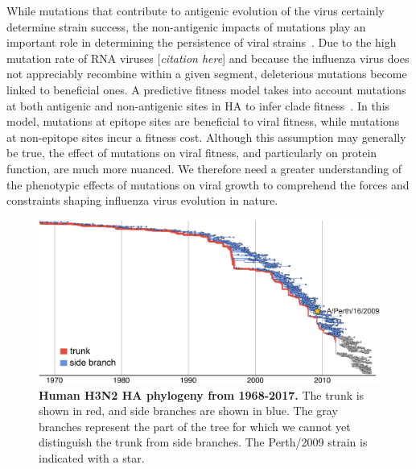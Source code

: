 \documentclass[9pt,twocolumn,twoside]{pnas-new}
\newcommand{\comment}[1]{{\color{red}[\textsl{#1}]}}
\begin{document}
While mutations that contribute to antigenic evolution of the virus certainly determine strain success, the non-antigenic impacts of mutations play an important role in determining the persistence of viral strains~\cite{pybus2007phylogenetic,kucharski2011influenza,strelkowa2012clonal,luksza2014predictive,koelle2015effects}.
Due to the high mutation rate of RNA viruses \comment{citation here} and because the influenza virus does not appreciably recombine within a given segment, deleterious mutations become linked to beneficial ones.
A predictive fitness model takes into account mutations at both antigenic and non-antigenic sites in HA to infer clade fitness~\cite{luksza2014predictive}.
In this model, mutations at epitope sites are beneficial to viral fitness, while mutations at non-epitope sites incur a fitness cost.
Although this assumption may generally be true, the effect of mutations on viral fitness, and particularly on protein function, are much more nuanced.
We therefore need a greater understanding of the phenotypic effects of mutations on viral growth to comprehend the forces and constraints shaping influenza virus evolution in nature.

\begin{figure}
\centering
\includegraphics[width=\linewidth]{figs/H3N2_phylogeny/H3N2_phylogeny.pdf}
\caption{\label{fig:H3N2_phylogeny}
{\bf Human H3N2 HA phylogeny from 1968-2017.}
The trunk is shown in red, and side branches are shown in blue.
The gray branches represent the part of the tree for which we cannot yet distinguish the trunk from side branches.
The Perth/2009 strain is indicated with a star.
}
\end{figure}
\end{document}
